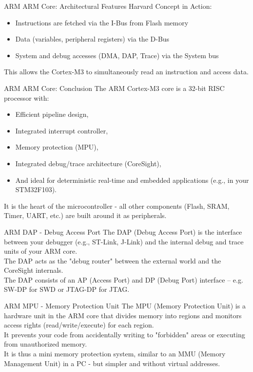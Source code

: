 \documentclass{beamer}
\begin{document}
\begin{frame}{ARM}
	{ARM Core: Architectural Features}
	Harvard Concept in Action:
	\begin{itemize}
		\item Instructions are fetched via the I-Bus from Flash memory
		\item Data (variables, peripheral registers) via the D-Bus
		\item System and debug accesses (DMA, DAP, Trace) via the System bus
	\end{itemize}
	This allows the Cortex-M3 to simultaneously read an instruction and access data.
\end{frame}
\begin{frame}{ARM}
	{ARM Core: Conclusion}
	The ARM Cortex-M3 core is a 32-bit RISC processor with:
	\begin{itemize}
		\item Efficient pipeline design,
		\item Integrated interrupt controller,
		\item Memory protection (MPU),
		\item Integrated debug/trace architecture (CoreSight),
		\item And ideal for deterministic real-time and embedded applications (e.g., in your STM32F103).
	\end{itemize}
	It is the heart of the microcontroller - all other components (Flash, SRAM, Timer, UART, etc.) are built around it as peripherals.
\end{frame}
\begin{frame}{ARM}
	{DAP - Debug Access Port}
	The DAP (Debug Access Port) is the interface between your debugger (e.g., ST-Link, J-Link) and the internal debug and trace units of your ARM core.\\
	\vspace{0.2cm}
	The DAP acts as the "debug router" between the external world and the CoreSight internals.\\
	\vspace{0.2cm}
	The DAP consists of an AP (Access Port) and DP (Debug Port) interface – e.g. SW-DP for SWD or JTAG-DP for JTAG.
\end{frame}
\begin{frame}{ARM}
	{MPU - Memory Protection Unit}
	The MPU (Memory Protection Unit) is a hardware unit in the ARM core that divides memory into regions and monitors access rights (read/write/execute) for each region.\\
	\vspace{0.2cm}
	It prevents your code from accidentally writing to "forbidden" areas or executing from unauthorized memory.\\
	\vspace{0.2cm}
	It is thus a mini memory protection system, similar to an MMU (Memory Management Unit) in a PC - but simpler and without virtual addresses.
\end{frame}
\end{document}
